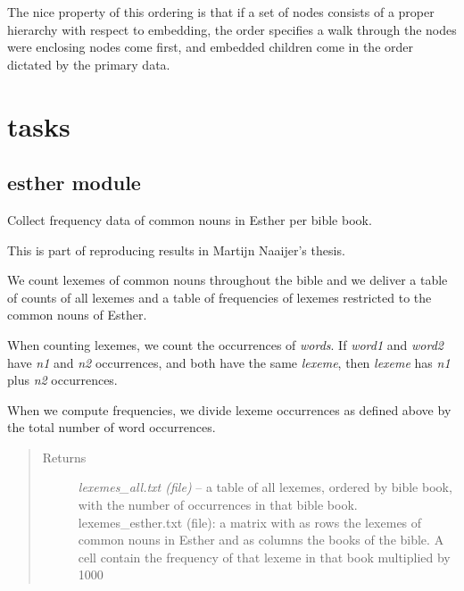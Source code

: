 \documentclass[letterpaper,10pt,english]{sphinxmanual}
\begin{document}
The nice property of this ordering is that if a set of nodes consists of a proper hierarchy with respect to embedding,
the order specifies a walk through the nodes were enclosing nodes come first,
and embedded children come in the order dictated by the primary data.


\chapter{tasks}
\label{tasks/modules:tasks}\label{tasks/modules::doc}

\section{esther module}
\label{tasks/esther:esther-module}\label{tasks/esther::doc}\label{tasks/esther:module-esther}

\begin{fulllineitems}
\label{tasks/esther:esther.task}
Collect frequency data of common nouns in Esther per bible book.

This is part of reproducing results in Martijn Naaijer's thesis.

We count lexemes of common nouns throughout the bible
and we deliver a table of counts of all lexemes and a table of
frequencies of lexemes restricted to the common nouns of Esther.

When counting lexemes, we count the occurrences of \emph{words}.
If \emph{word1} and \emph{word2} have \emph{n1} and \emph{n2} occurrences, and both
have the same \emph{lexeme}, then \emph{lexeme} has \emph{n1} plus \emph{n2}
occurrences.

When we compute frequencies, we divide lexeme occurrences as defined
above by the total number of word occurrences.
\begin{quote}\begin{description}
\item[{Returns}] \leavevmode
\emph{lexemes\_all.txt (file)} --
a table of all lexemes, ordered by bible book, with the number
of occurrences in that bible book.
lexemes\_esther.txt (file): a matrix with as rows the lexemes of
common nouns in Esther and as columns the books of the bible.
A cell contain the frequency of that lexeme in that book multiplied by 1000

\end{description}\end{quote}

\end{fulllineitems}
\end{document}
